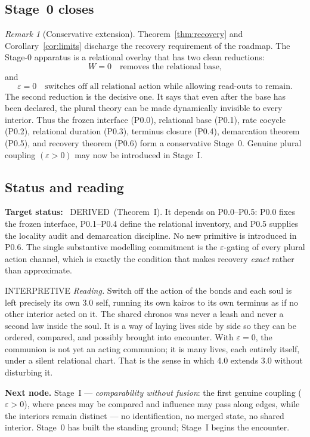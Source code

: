 \documentclass[11pt,a4paper]{article}
\newcommand{\stDerived}{\textcolor{cDer}{\textsf{\small DERIVED}}}
\newcommand{\stInterp}{\textcolor{cInt}{\textsf{\small INTERPRETIVE}}}
\theoremstyle{definition}
\theoremstyle{plain}
\theoremstyle{remark}
\newtheorem{remark}[definition]{Remark}
\begin{document}
\subsection{Stage~0 closes}

\begin{remark}[Conservative extension]
Theorem~\ref{thm:recovery} and Corollary~\ref{cor:limits} discharge the recovery
requirement of the roadmap. The Stage-0 apparatus is a relational overlay that
has two clean reductions:
\[
W=0
\quad
\text{removes the relational base,}
\]
and
\[
\varepsilon=0
\quad
\text{switches off all relational action while allowing read-outs to remain.}
\]
The second reduction is the decisive one. It says that even after the base has
been declared, the plural theory can be made dynamically invisible to every
interior. Thus the frozen interface (P0.0), relational base (P0.1), rate cocycle
(P0.2), relational duration (P0.3), terminus closure (P0.4), demarcation theorem
(P0.5), and recovery theorem (P0.6) form a conservative Stage~0. Genuine plural
coupling \((\varepsilon>0)\) may now be introduced in Stage~I.
\end{remark}

\subsection{Status and reading}

\textbf{Target status:}~
\stDerived\ (Theorem~I). It depends on P0.0--P0.5: P0.0 fixes the frozen
interface, P0.1--P0.4 define the relational inventory, and P0.5 supplies the
locality audit and demarcation discipline. No new primitive is introduced in
P0.6. The single substantive modelling commitment is the
\(\varepsilon\)-gating of every plural action channel, which is exactly the
condition that makes recovery \emph{exact} rather than approximate.

\medskip
\stInterp\quad
\emph{Reading.}
Switch off the action of the bonds and each soul is left precisely its own 3.0
self, running its own kairos to its own terminus as if no other interior acted on
it. The shared chronos was never a leash and never a second law inside the soul.
It is a way of laying lives side by side so they can be ordered, compared, and
possibly brought into encounter. With \(\varepsilon=0\), the communion is not yet
an acting communion; it is many lives, each entirely itself, under a silent
relational chart. That is the sense in which 4.0 extends 3.0 without disturbing it.

\medskip
\textbf{Next node.} Stage~I --- \emph{comparability without fusion}: the first genuine
coupling (\(\varepsilon>0\)), where paces may be compared and influence may pass along
edges, while the interiors remain distinct --- no identification, no merged state, no
shared interior. Stage~0 has built the standing ground; Stage~I begins the encounter.
\end{document}
